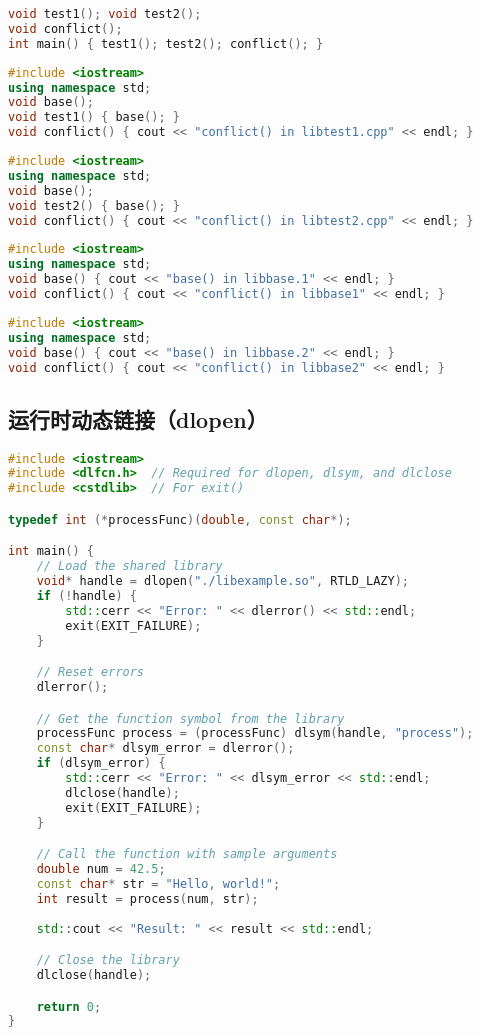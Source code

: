 \begin{lstlisting}[language=cpp, caption=main.cpp]
void test1(); void test2();
void conflict();
int main() { test1(); test2(); conflict(); }
\end{lstlisting}

\begin{lstlisting}[language=cpp, caption=libtest1.cpp]
#include <iostream>
using namespace std;
void base();
void test1() { base(); }
void conflict() { cout << "conflict() in libtest1.cpp" << endl; }
\end{lstlisting}

\begin{lstlisting}[language=cpp, caption=libtest2.cpp]
#include <iostream>
using namespace std;
void base();
void test2() { base(); }
void conflict() { cout << "conflict() in libtest2.cpp" << endl; }
\end{lstlisting}

\begin{lstlisting}[language=cpp, caption=libtest1.cpp]
#include <iostream>
using namespace std;
void base() { cout << "base() in libbase.1" << endl; }
void conflict() { cout << "conflict() in libbase1" << endl; }
\end{lstlisting}

\begin{lstlisting}[language=cpp, caption=libtest2.cpp]
#include <iostream>
using namespace std;
void base() { cout << "base() in libbase.2" << endl; }
void conflict() { cout << "conflict() in libbase2" << endl; }
\end{lstlisting}

\subsection{运行时动态链接（dlopen）}
\begin{lstlisting}[language=cpp]
#include <iostream>
#include <dlfcn.h>  // Required for dlopen, dlsym, and dlclose
#include <cstdlib>  // For exit()

typedef int (*processFunc)(double, const char*);

int main() {
    // Load the shared library
    void* handle = dlopen("./libexample.so", RTLD_LAZY);
    if (!handle) {
        std::cerr << "Error: " << dlerror() << std::endl;
        exit(EXIT_FAILURE);
    }

    // Reset errors
    dlerror();

    // Get the function symbol from the library
    processFunc process = (processFunc) dlsym(handle, "process");
    const char* dlsym_error = dlerror();
    if (dlsym_error) {
        std::cerr << "Error: " << dlsym_error << std::endl;
        dlclose(handle);
        exit(EXIT_FAILURE);
    }

    // Call the function with sample arguments
    double num = 42.5;
    const char* str = "Hello, world!";
    int result = process(num, str);
    
    std::cout << "Result: " << result << std::endl;

    // Close the library
    dlclose(handle);

    return 0;
}

\end{lstlisting}

